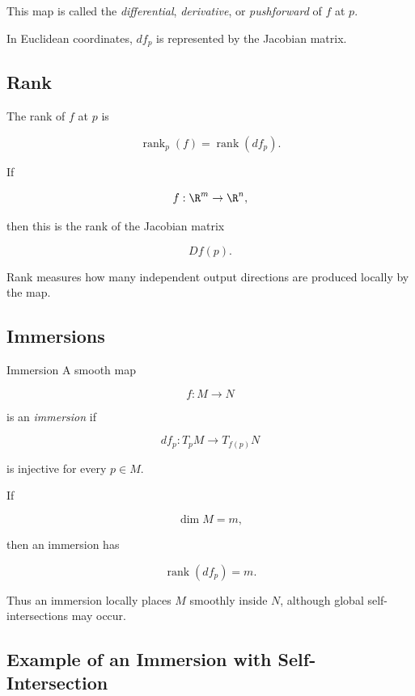 This map is called the \emph{differential}, \emph{derivative}, or
\emph{pushforward} of \(f\) at \(p\).

In Euclidean coordinates, \(df_p\) is represented by the Jacobian matrix.

\subsection{Rank}
\label{subsec:differential-topology-rank}

The rank of \(f\) at \(p\) is

\[
\boxed{
\operatorname{rank}_p(f)
=
\operatorname{rank}(df_p).
}
\]

If

\[
f:\R^m\to\R^n,
\]

then this is the rank of the Jacobian matrix

\[
Df(p).
\]

Rank measures how many independent output directions are produced locally
by the map.

\subsection{Immersions}
\label{subsec:immersions}

\begin{definitionbox}{Immersion}
A smooth map

\[
f:M\to N
\]

is an \emph{immersion} if

\[
\boxed{
df_p:T_pM\to T_{f(p)}N
}
\]

is injective for every \(p\in M\).
\end{definitionbox}

If

\[
\dim M=m,
\]

then an immersion has

\[
\boxed{
\operatorname{rank}(df_p)=m.
}
\]

Thus an immersion locally places \(M\) smoothly inside \(N\), although
global self-intersections may occur.

\subsection{Example of an Immersion with Self-Intersection}
\label{subsec:immersion-self-intersection}

